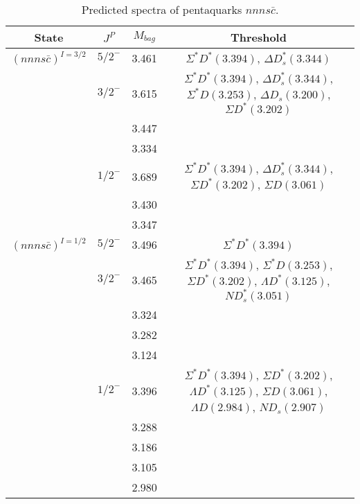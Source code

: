 \documentclass[prd,twocolumn,floatfix,nofootinbib]{revtex4}
\begin{document}
\renewcommand{\tabcolsep}{0.5cm}
\renewcommand{\arraystretch}{1.2}
\begin{table*}[!htbp]
    \caption{Predicted spectra of pentaquarks $nnns\bar{c}$.}
    \begin{tabular}{cccc}
        \hline\hline
        {\rm State} &$J^{P}$ &$M_{bag}$ &{\rm Threshold} \\ \hline
        ${(nnns\bar{c})}^{I=3/2}$
            &${5/2}^{-}$    &3.461 &$\Sigma^{\ast} D^{\ast}(3.394)$, $\Delta D^{\ast}_{s}(3.344)$ \\
            &${3/2}^{-}$    &3.615 &$\Sigma^{\ast} D^{\ast}(3.394)$, $\Delta D^{\ast}_{s}(3.344)$, $\Sigma^{\ast} D(3.253)$, $\Delta D_{s}(3.200)$, $\Sigma D^{\ast}(3.202)$ \\
            &               &3.447 & \\
            &               &3.334 & \\
            &${1/2}^{-}$    &3.689 &$\Sigma^{\ast} D^{\ast}(3.394)$, $\Delta D^{\ast}_{s}(3.344)$, $\Sigma D^{\ast}(3.202)$, $\Sigma D(3.061)$ \\
            &               &3.430 & \\
            &               &3.347 & \\
        ${(nnns\bar{c})}^{I=1/2}$
            &${5/2}^{-}$    &3.496 &$\Sigma^{\ast} D^{\ast}(3.394)$ \\
            &${3/2}^{-}$    &3.465 &$\Sigma^{\ast} D^{\ast}(3.394)$, $\Sigma^{\ast} D(3.253)$, $\Sigma D^{\ast}(3.202)$, $\Lambda D^{\ast}(3.125)$, $N D^{\ast}_{s}(3.051)$ \\
            &               &3.324 & \\
            &               &3.282 & \\
            &               &3.124 & \\
            &${1/2}^{-}$    &3.396 &$\Sigma^{\ast} D^{\ast}(3.394)$, $\Sigma D^{\ast}(3.202)$, $\Lambda D^{\ast}(3.125)$, $\Sigma D(3.061)$, $\Lambda D(2.984)$, $N D_{s}(2.907)$ \\
            &               &3.288 & \\
            &               &3.186 & \\
            &               &3.105 & \\
            &               &2.980 & \\
        \hline\hline
    \end{tabular}
\end{table*}
\end{document}
